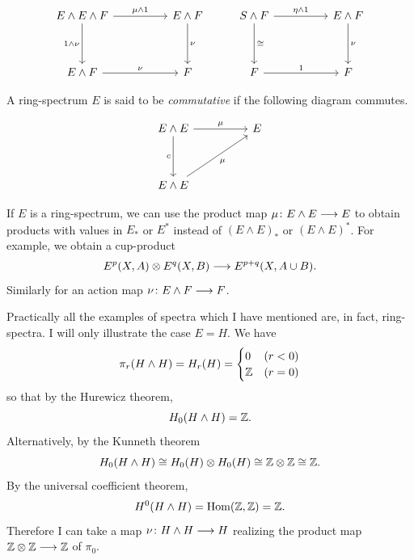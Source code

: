 \documentclass[../main]{subfiles}
\begin{document}
\[
\begin{tikzcd}
E \wedge E \wedge F \arrow[dd, "1 \wedge \nu"'] \arrow[rr, "\mu \wedge 1"] &  & E \wedge F \arrow[dd, "\nu"] & S \wedge F \arrow[rr, "\eta \wedge 1"] \arrow[dd, "\cong"] &  & E \wedge F \arrow[dd, "\nu"] \\
                                                                           &  &                              &                                                   &  &                              \\
E \wedge F \arrow[rr, "\nu"]                                               &  & F                            & F \arrow[rr, "1"]                                 &  & F                           
\end{tikzcd}
\]


A ring-spectrum $E$ is said to be \emph{commutative}  if the following diagram commutes.



\[
\begin{tikzcd}
E \wedge E \arrow[rr, "\mu"] \arrow[dd, "c"'] &  & E \\
                                              &  &   \\
E \wedge E \arrow[rruu, "\mu"']               &  &  
\end{tikzcd}
\]


If $E$ is a ring-spectrum, we can use the product map $\mu \colon E \wedge E \longrightarrow E$ to obtain products with values in $E_*$ or $E^*$ instead of $(E \wedge E)_*$ or $(E \wedge E)^*$. For example, we obtain a cup-product 
\[E^p(X,A) \otimes E^q(X,B) \longrightarrow E^{p+q}(X,A \cup B).\]
Similarly for an action map $\nu \colon E \wedge F \longrightarrow F$.

Practically all the examples of spectra which I have mentioned are, in fact, ring-spectra. I will only illustrate the case $E=H$. We have
\[\pi_r (H \wedge H) = H_r(H) = \begin{cases}
    0 & (r < 0) \\
    \mathbb{Z} & (r=0)
\end{cases}\]
so that by the Hurewicz theorem,
\[H_0(H \wedge H) = \mathbb{Z}.\]
Alternatively, by the Kunneth theorem
\[H_0(H \wedge H) \cong H_0(H) \otimes H_0(H) \cong \mathbb{Z} \otimes \mathbb{Z} \cong \mathbb{Z}.\]
By the universal coefficient theorem,
\[H^0(H \wedge H) = \mathrm{Hom}(\mathbb{Z},\mathbb{Z}) = \mathbb{Z}.\]
Therefore I can take a map $\nu \colon H \wedge H \longrightarrow H$ realizing the product map $\mathbb{Z} \otimes \mathbb{Z} \longrightarrow \mathbb{Z}$ of $\pi_0$.
\end{document}

